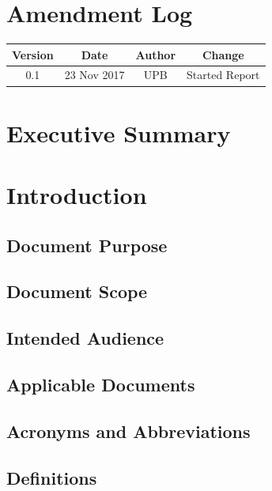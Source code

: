 \documentclass[11pt]{article}
\begin{document}
\section{Amendment Log}

\begin{table} 
 \begin{tabular}{||c c c c||} 
 \hline
 Version & Date & Author & Change \\ [0.5ex] 
 \hline\hline
 0.1 & 23 Nov 2017 & UPB & Started Report
\end{tabular}
\end{table}

\newpage

\section{Executive Summary}

\newpage

\listoffigures

\listoftables

\newpage

\section{Introduction}

\subsection{Document Purpose}

\subsection{Document Scope}

\subsection{Intended Audience}

\subsection{Applicable Documents}

\subsection{Acronyms and Abbreviations}

\subsection{Definitions}
\end{document}

